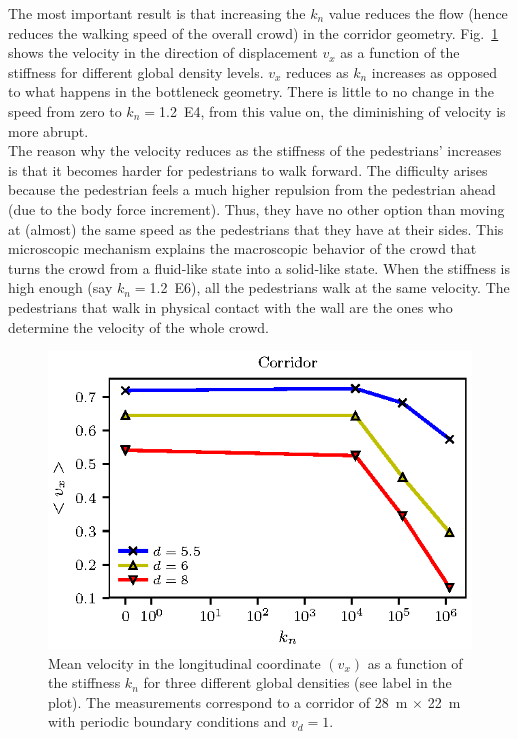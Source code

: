 \documentclass[preprint,12pt]{elsarticle}
\begin{document}
The most important result is that increasing the $k_n$ value reduces the flow (hence reduces the walking speed of the overall crowd) in the corridor geometry. Fig.~\ref{kn_vs_vx_corridor} shows the velocity in the direction of displacement $v_x$ as a function of the stiffness for different global density levels. $v_x$ reduces as $k_n$ increases as opposed to what happens in the bottleneck geometry. There is little to no change in the speed from zero to $k_n=$1.2~E4, from this value on, the diminishing of velocity is more abrupt.\\

The reason why the velocity reduces as the stiffness of the pedestrians' increases is that it becomes harder for pedestrians to walk forward. The difficulty arises because the pedestrian feels a much higher repulsion from the pedestrian ahead (due to the body force increment). Thus, they have no other option than moving at (almost) the same speed as the pedestrians that they have at their sides. This microscopic mechanism explains the macroscopic behavior of the crowd that turns the crowd from a fluid-like state into a solid-like state. When the stiffness is high enough (say $k_n=$1.2~E6), all the pedestrians walk at the same velocity. The pedestrians that walk in physical contact with the wall are the ones who determine the velocity of the whole crowd.\\


\begin{figure}[htbp!]
\centering
\includegraphics[width=0.7\columnwidth]{./kn_vs_vx_corridor.eps}
\caption{\label{kn_vs_vx_corridor} Mean velocity in the longitudinal coordinate $(v_x)$ as a function of the stiffness $k_n$ for three different global densities (see label in the plot). The measurements correspond to a corridor of 28~m $\times$ 22~m with periodic boundary conditions and $v_d=1$.      }
\end{figure}
\end{document}
